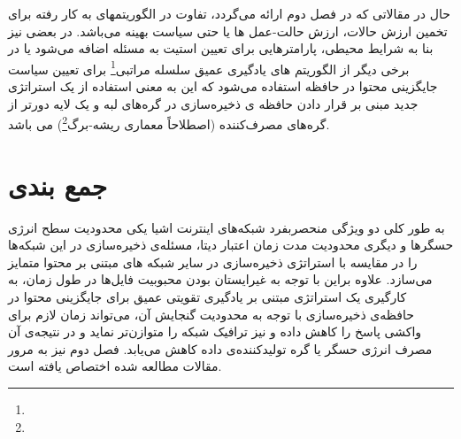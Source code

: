  حال در  مقالاتی که در فصل دوم ارائه می‌گردد، تفاوت در الگوریتمهای به کار رفته برای تخمین ارزش حالات، ارزش حالت-عمل ها یا حتی سیاست بهینه می‌باشد. در بعضی نیز بنا به شرایط محیطی، پارامترهایی برای تعیین استیت به مسئله اضافه می‌شود یا در برخی دیگر از الگوریتم های یادگیری عمیق سلسله مراتبی\footnote{} برای تعیین سیاست جایگزینی محتوا در حافظه استفاده می‌شود که این به معنی استفاده از یک استراتژی جدید مبنی بر قرار دادن حافظه ی ذخیره‌سازی در گره‌های لبه و یک لایه دورتر از گره‌های مصرف‌کننده (اصطلاحاً معماری ریشه-برگ\footnote{}) می باشد.

\section{جمع بندی}
به طور کلی دو ویژگی منحصربفرد شبکه‌های اینترنت اشیا یکی محدودیت سطح انرژی حسگرها و دیگری محدودیت مدت زمان اعتبار دیتا، مسئله‌ی ذخیره‌سازی در این شبکه‌ها را در مقایسه با استراتژی ذخیره‌سازی در سایر شبکه های مبتنی بر محتوا متمایز می‌سازد. علاوه براین با توجه به غیرایستان بودن محبوبیت فایل‌ها در طول زمان، به کارگیری یک استراتژی مبتنی بر یادگیری تقویتی عمیق برای جایگزینی محتوا در حافظه‌ی ذخیره‌سازی با توجه به محدودیت گنجایش آن، می‌تواند زمان لازم برای واکشی پاسخ را کاهش داده و نیز ترافیک شبکه را متوازن‌تر نماید و در نتیجه‌ی آن مصرف انرژی حسگر یا گره تولیدکننده‌ی داده کاهش می‌یابد. فصل دوم نیز به مرور مقالات مطالعه شده اختصاص یافته است.





